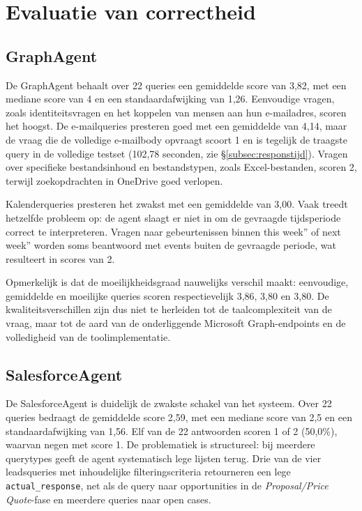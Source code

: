 \section{Evaluatie van correctheid}
\label{sec:evaluatie-correctheid}

\subsection*{GraphAgent}

De GraphAgent behaalt over 22 queries een gemiddelde score van 3,82, met een mediane score van 4 en een standaardafwijking van 1,26. Eenvoudige vragen, zoals identiteitsvragen en het koppelen van mensen aan hun e-mailadres, scoren het hoogst. De e-mailqueries presteren goed met een gemiddelde van 4,14, maar de vraag die de volledige e-mailbody opvraagt scoort 1 en is tegelijk de traagste query in de volledige testset (102,78 seconden, zie \S\ref{subsec:responstijd}). Vragen over specifieke bestandsinhoud en bestandstypen, zoals Excel-bestanden, scoren 2, terwijl zoekopdrachten in OneDrive goed verlopen.

Kalenderqueries presteren het zwakst met een gemiddelde van 3,00. Vaak treedt hetzelfde probleem op: de agent slaagt er niet in om de gevraagde tijdsperiode correct te interpreteren. Vragen naar gebeurtenissen binnen this week'' of next week'' worden soms beantwoord met events buiten de gevraagde periode, wat resulteert in scores van 2.

Opmerkelijk is dat de moeilijkheidsgraad nauwelijks verschil maakt: eenvoudige, gemiddelde en moeilijke queries scoren respectievelijk 3,86, 3,80 en 3,80. De kwaliteitsverschillen zijn dus niet te herleiden tot de taalcomplexiteit van de vraag, maar tot de aard van de onderliggende Microsoft Graph-endpoints en de volledigheid van de toolimplementatie.

\subsection*{SalesforceAgent}

De SalesforceAgent is duidelijk de zwakste schakel van het systeem. Over 22 queries bedraagt de gemiddelde score 2,59, met een mediane score van 2,5 en een standaardafwijking van 1,56. Elf van de 22 antwoorden scoren 1 of 2 (50,0\%), waarvan negen met score 1. De problematiek is structureel: bij meerdere querytypes geeft de agent systematisch lege lijsten terug. Drie van de vier leadsqueries met inhoudelijke filteringscriteria retourneren een lege \texttt{actual\_response}, net als de query naar opportunities in de \textit{Proposal/Price Quote}-fase en meerdere queries naar open cases.

